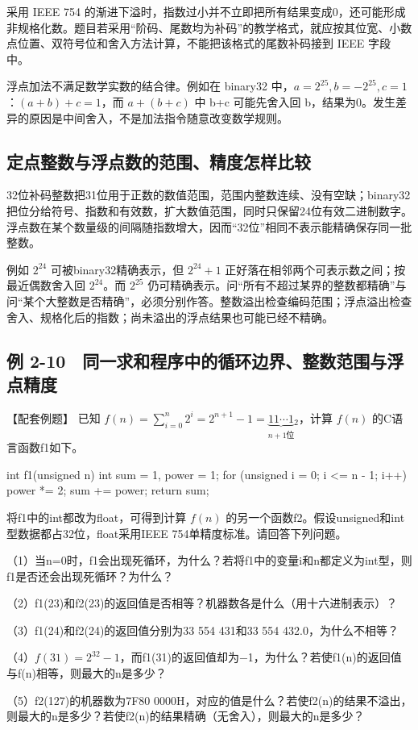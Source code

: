 采用 IEEE 754 的渐进下溢时，指数过小并不立即把所有结果变成0，还可能形成非规格化数。题目若采用``阶码、尾数均为补码''的教学格式，就应按其位宽、小数点位置、双符号位和舍入方法计算，不能把该格式的尾数补码接到 IEEE 字段中。

浮点加法不满足数学实数的结合律。例如在 binary32 中，\(a=2^{25},b=-2^{25},c=1\)：\((a+b)+c=1\)，而 \(a+(b+c)\) 中 b+c 可能先舍入回 b，结果为0。发生差异的原因是中间舍入，不是加法指令随意改变数学规则。

\subsection{定点整数与浮点数的范围、精度怎样比较}\label{CO02-23}

32位补码整数把31位用于正数的数值范围，范围内整数连续、没有空缺；binary32把位分给符号、指数和有效数，扩大数值范围，同时只保留24位有效二进制数字。浮点数在某个数量级的间隔随指数增大，因而``32位''相同不表示能精确保存同一批整数。

例如 \(2^{24}\) 可被binary32精确表示，但 \(2^{24}+1\) 正好落在相邻两个可表示数之间；按最近偶数舍入回 \(2^{24}\)。而 \(2^{25}\) 仍可精确表示。问``所有不超过某界的整数都精确''与问``某个大整数是否精确''，必须分别作答。整数溢出检查编码范围；浮点溢出检查舍入、规格化后的指数；尚未溢出的浮点结果也可能已经不精确。

\subsection{例 2-10　同一求和程序中的循环边界、整数范围与浮点精度}\label{CO02-24}

\begin{example}[配套例题]

【配套例题】 已知 \(f(n)=\sum_{i=0}^{n}2^i=2^{n+1}-1=\underbrace{11\cdots1}_{n+1\text{位}}{}_2\)，计算 \(f(n)\) 的C语言函数f1如下。

\begin{codeblock}[language=C]
int f1(unsigned n) {
    int sum = 1, power = 1;
    for (unsigned i = 0; i <= n - 1; i++) {
        power *= 2;
        sum += power;
    }
    return sum;
}
\end{codeblock}

将f1中的int都改为float，可得到计算 \(f(n)\) 的另一个函数f2。假设unsigned和int型数据都占32位，float采用IEEE 754单精度标准。请回答下列问题。

（1）当n=0时，f1会出现死循环，为什么？若将f1中的变量i和n都定义为int型，则f1是否还会出现死循环？为什么？

（2）f1(23)和f2(23)的返回值是否相等？机器数各是什么（用十六进制表示）？

（3）f1(24)和f2(24)的返回值分别为33 554 431和33 554 432.0，为什么不相等？

（4）\(f(31)=2^{32}-1\)，而f1(31)的返回值却为\ensuremath{-}1，为什么？若使f1(n)的返回值与f(n)相等，则最大的n是多少？

（5）f2(127)的机器数为7F80 0000H，对应的值是什么？若使f2(n)的结果不溢出，则最大的n是多少？若使f2(n)的结果精确（无舍入），则最大的n是多少？

\end{example}

